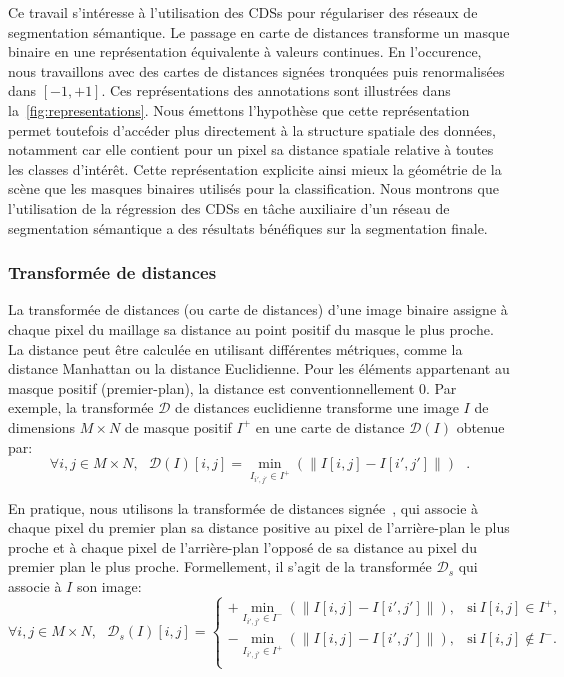 Ce travail s'intéresse à l'utilisation des \glspl{CDS} pour régulariser des réseaux de segmentation sémantique. Le passage en carte de distances transforme un masque binaire en une représentation équivalente à valeurs continues. En l'occurence, nous travaillons avec des cartes de distances signées tronquées puis renormalisées dans $[-1,+1]$. Ces représentations des annotations sont illustrées dans la~\cref{fig:representations}. Nous émettons l'hypothèse que cette représentation permet toutefois d'accéder plus directement à la structure spatiale des données, notamment car elle contient pour un pixel sa distance spatiale relative à toutes les classes d'intérêt. Cette représentation explicite ainsi mieux la géométrie de la scène que les masques binaires utilisés pour la classification. Nous montrons que l'utilisation de la régression des \glspl{CDS} en tâche auxiliaire d'un réseau de segmentation sémantique a des résultats bénéfiques sur la segmentation finale.

\subsubsection{Transformée de distances}

La transformée de distances (ou carte de distances) d'une image binaire assigne à chaque pixel du maillage sa distance au point positif du masque le plus proche. La distance peut être calculée en utilisant différentes métriques, comme la distance Manhattan ou la distance Euclidienne. Pour les éléments appartenant au masque positif (premier-plan), la distance est conventionnellement 0. Par exemple, la transformée $\mathcal{D}$ de distances euclidienne transforme une image $I$ de dimensions $M\times N$ de masque positif $I^+$ en une carte de distance $\mathcal{D}(I)$ obtenue par:
\begin{equation}
  \forall i,j \in M\times N, ~~~\mathcal{D}(I)[i,j] = \min_{I_{i',j'} \in I^+} (\parallel I[i,j] - I[i',j'] \parallel)~~~.
\end{equation}

En pratique, nous utilisons la transformée de distances signée~\cite{q._z._ye_signed_1988}, qui associe à chaque pixel du premier plan sa distance positive au pixel de l'arrière-plan le plus proche et à chaque pixel de l'arrière-plan l'opposé de sa distance au pixel du premier plan le plus proche. Formellement, il s'agit de la transformée $\mathcal{D}_s$ qui associe à $I$ son image:
\begin{equation}
\forall i,j \in M\times N,~~~\mathcal{D}_s(I)[i,j] =
\begin{cases}
+ \min_{I_{i',j'} \in I^-} (\parallel I[i,j] - I[i',j'] \parallel), & \text{si}~I[i,j] \in I^+,\\
- \min_{I_{i',j'} \in I^+} (\parallel I[i,j] - I[i',j'] \parallel), & \text{si}~I[i,j] \notin I^-.\\
\end{cases}
\end{equation}

